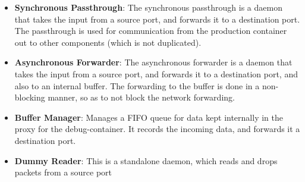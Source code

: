\begin{itemize}[leftmargin=*]
	\item \textbf{Synchronous Passthrough}: The synchronous passthrough is a daemon that takes the input from a source port, and forwards it to a destination port. The passthrough is used for communication from the production container out to other components (which is not duplicated).
	\item \textbf{Asynchronous Forwarder}: The asynchronous forwarder is a daemon that takes the input from a source port, and forwards it to a destination port, and also to an internal buffer. The forwarding to the buffer is done in a non-blocking manner, so as to not block the network forwarding. 
	\item \textbf{Buffer Manager}: Manages a FIFO queue for data kept internally in the proxy for the debug-container.
	It records the incoming data, and forwards it a destination port. 
	\item \textbf{Dummy Reader}: This is a standalone daemon, which reads and drops packets from a source port
\end{itemize}

\noindent






